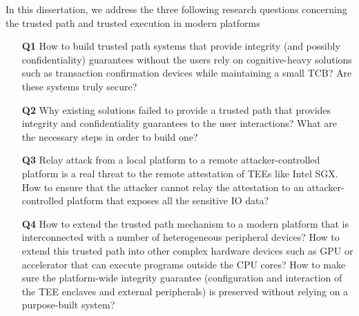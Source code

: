 In this dissertation, we address the three following research questions concerning the trusted path and trusted execution in modern platforms 
\begin{enumerate}
  
  	\item[\textbf{Q1}] How to build trusted path systems that provide integrity (and possibly confidentiality) guarantees without the users rely on cognitive-heavy solutions such as transaction confirmation devices while maintaining a small TCB? Are these systems truly secure?
  	
    \item[\textbf{Q2}] Why existing solutions failed to provide a trusted path that provides integrity and confidentiality guarantees to the user interactions? What are the necessary steps in order to build one?
    
    \item[\textbf{Q3}] Relay attack from a local platform to a remote attacker-controlled platform is a real threat to the remote attestation of TEEs like Intel SGX. How to ensure that the attacker cannot relay the attestation to an attacker-controlled platform that exposes all the sensitive IO data?
    
    \item[\textbf{Q4}] How to extend the trusted path mechanism to a modern platform that is interconnected with a number of heterogeneous peripheral devices? How to extend this trusted path into other complex hardware devices such as GPU or accelerator that can execute programs outside the CPU cores? How to make sure the platform-wide integrity guarantee (configuration and interaction of the TEE enclaves and external peripherals) is preserved without relying on a purpose-built system?  
\end{enumerate}

